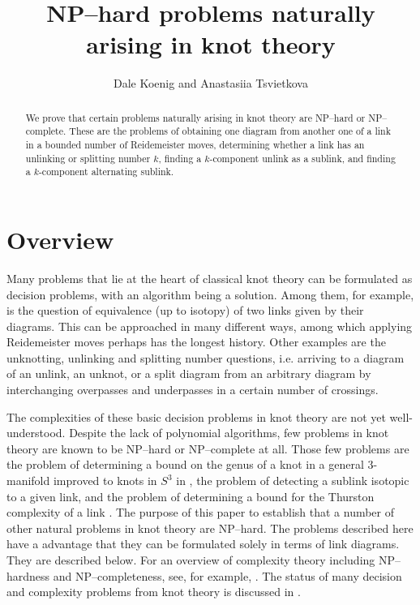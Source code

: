 \documentclass[12pt]{amsart}
\theoremstyle{definition}
\theoremstyle{remark}
\begin{document}
\title{NP--hard problems naturally arising in knot theory}
\author{Dale Koenig and Anastasiia Tsvietkova}
\date{}
 \footnotesize
 \begin{abstract}
We prove that certain problems naturally arising in knot theory are NP--hard or NP--complete.
These are the problems of obtaining one diagram from another one of a link in a bounded number of Reidemeister moves, determining whether a link has an unlinking or splitting number $k$, finding a $k$-component unlink as a sublink, and finding a $k$-component alternating sublink.
\end{abstract}
\maketitle
\normalsize
\section{Overview}



Many problems that lie at the heart of classical knot theory can be formulated as decision problems, with an algorithm being a solution.
Among them, for example, is the question of equivalence (up to isotopy) of two links given by their diagrams.
This can be approached in many different ways, among which applying Reidemeister moves perhaps has the longest history.
Other examples are the unknotting, unlinking and splitting number questions, i.e.
arriving to a diagram of an unlink, an unknot, or a split diagram from an arbitrary diagram by interchanging overpasses and underpasses in a certain number of crossings.

The complexities of these basic decision problems in knot theory are not yet well-understood.
Despite the lack of polynomial algorithms, few problems in knot theory are known to be NP--hard or NP--complete at all.
Those few problems are the problem of determining a bound on the genus of a knot in a general 3-manifold \cite{AgolHassThurston1} improved to knots in $S^3$ in \cite{Lackenby1}, the problem of detecting a sublink isotopic to a given link, and the problem of determining a bound for the Thurston complexity of a link  \cite{Lackenby1}.
The purpose of this paper to establish that a number of other natural problems in knot theory are NP--hard.
The problems described here have a advantage that they can be formulated solely in terms of link diagrams.
They are described below.
For an overview of complexity theory including NP--hardness and NP--completeness, see, for example, \cite{GareyJohnson1}.
The status of many decision and complexity problems from knot theory is discussed in \cite{Lackenby3}.
\end{document}
